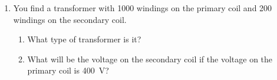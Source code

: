 {{\begin{eocexercises}{}
\begin {enumerate}
\item You find a transformer with 1000 windings on the primary coil and 200 windings on the secondary coil.
\begin{enumerate}
\item What type of transformer is it?
\item What will be the voltage on the secondary coil if the voltage on the primary coil is 400~V?

\end{enumerate}



\end{enumerate}
\end{eocexercises}}}
